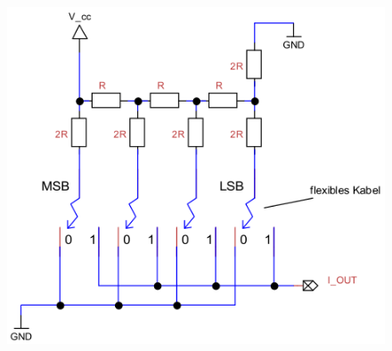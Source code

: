 \begin{frame}
\begin{columns}[c]
\begin{figure}[H]
\begin{center}
                         \includegraphics[scale=0.2]{./img/schaltung/r2r_0.png}
                 \end{center}
            \end{figure}
    \end{columns}
\end{frame}

